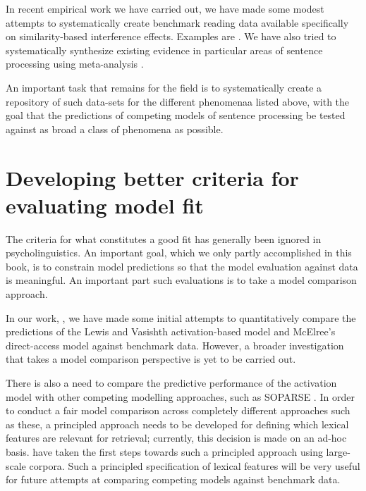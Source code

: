\documentclass{cambridge7A}\usepackage[]{graphicx}\usepackage[]{color}
\begin{document}
In recent empirical work we have carried out, we have made some modest attempts to systematically create benchmark reading data available specifically on similarity-based interference effects. Examples are 
 \cite{JaegerMertzenVanDykeVasishth2019,VasishthMertzenJaegerGelman2018,Mertzenretro,Mertzenproretro,MertzenEtAlAMLaP2019}. We  have also  tried to systematically synthesize existing evidence in particular areas of sentence processing using meta-analysis \citep{JaegerEngelmannVasishth2017,BuerkiEtAl2020}.

An important task that remains for the field is to  systematically create a repository of such data-sets for the different phenomenaa listed above, with the goal that the predictions of competing models of sentence processing be tested against as broad a class of phenomena as possible.

\section{Developing better criteria for evaluating model fit}

The \cite{rp} criteria for what constitutes a good fit has generally been ignored in psycholinguistics. An important goal, which we only partly accomplished in this book, is to constrain model predictions  so that the model evaluation against data is meaningful. An important part such evaluations is to take a model comparison approach.

In our work, \citep[e.g.,][]{NicenboimRetrieval2018,LissonEtAl2020}, we have made some initial attempts to quantitatively compare the predictions of the Lewis and Vasishth activation-based model and McElree's direct-access model against benchmark data. However, a broader investigation that takes a model comparison perspective is yet to be carried out.  

There is also a need to compare the predictive performance of the activation model with other competing modelling  approaches, such as SOPARSE \citep{SmithFranckTaborCogSci2018}. In order to conduct a fair model comparison across completely different approaches such as these, a principled approach needs to be developed for defining which lexical features are relevant for retrieval; currently, this decision is made on an ad-hoc basis. \cite{smith2019smithvasishthfeatures} have taken the first steps towards such a principled approach using large-scale corpora. Such a principled specification of lexical features will be very useful for future attempts at comparing competing models against benchmark data.
\end{document}
